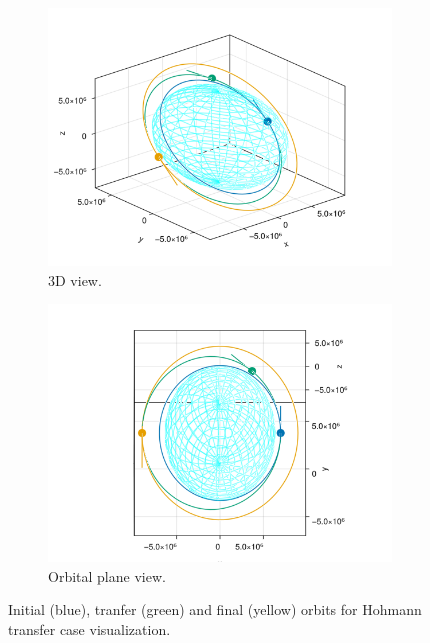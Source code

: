 \begin{figure}[htbp]
    \centering
    \begin{subfigure}{0.49\textwidth}
        \includegraphics[width=\textwidth]{img/hohmann_condition.png}
        \caption{3D view.}
    \end{subfigure}
    \begin{subfigure}{0.49\textwidth}
        \includegraphics[width=\textwidth]{img/hohmann_condition_in_plane.png}
        \caption{Orbital plane view.}
    \end{subfigure}
    \caption{Initial (blue), tranfer (green) and final (yellow) orbits for Hohmann transfer case visualization.}
    \label{fig:hohmann_condition}
\end{figure}

